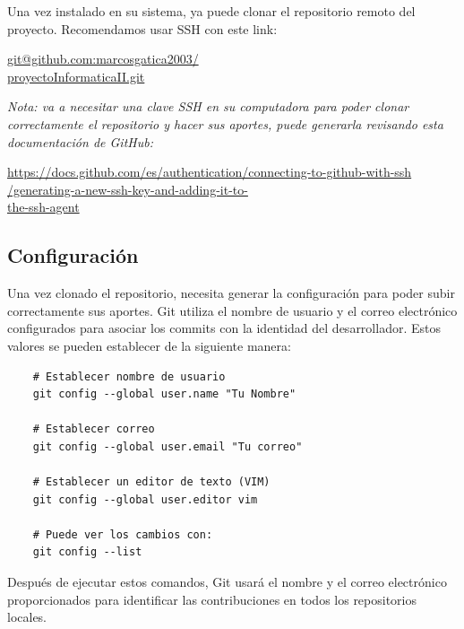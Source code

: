 \documentclass[a4paper]{article}
\begin{document}
\newpage
\noindent
\thispagestyle{fancy}

\thispagestyle{fancy}
\indent Una vez instalado en su sistema, ya puede clonar el repositorio remoto del proyecto. Recomendamos usar SSH con este link: 

\begin{center}
    \url{git@github.com:marcosgatica2003/} \\
    \url{proyectoInformaticaII.git} \\
\end{center}

\textit{Nota: va a necesitar una clave SSH en su computadora para poder clonar correctamente el repositorio y hacer sus aportes, puede generarla revisando esta documentación de GitHub:}

\begin{center}
    \url{https://docs.github.com/es/authentication/connecting-to-github-with-ssh} \\
    \url{/generating-a-new-ssh-key-and-adding-it-to-} \\
    \url{the-ssh-agent} \\
\end{center}

\subsection{Configuración}
\indent Una vez clonado el repositorio, necesita generar la configuración para poder subir correctamente sus aportes. 
Git utiliza el nombre de usuario y el correo electrónico configurados para asociar los commits con la identidad del desarrollador. Estos valores se pueden establecer de la siguiente manera:

\begin{lstlisting}
    # Establecer nombre de usuario
    git config --global user.name "Tu Nombre"

    # Establecer correo
    git config --global user.email "Tu correo"

    # Establecer un editor de texto (VIM)
    git config --global user.editor vim

    # Puede ver los cambios con:
    git config --list

\end{lstlisting}

Después de ejecutar estos comandos, Git usará el nombre y el correo electrónico proporcionados para identificar las contribuciones en todos los repositorios locales.
\end{document}
